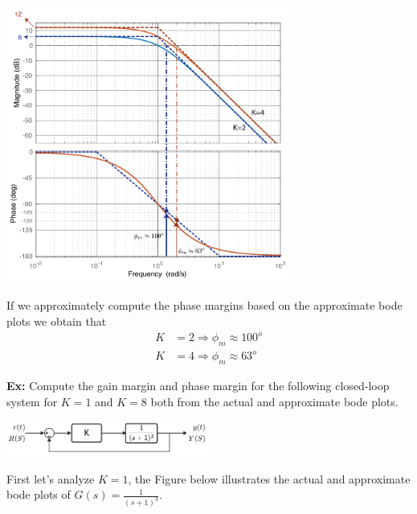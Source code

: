 \documentclass[twoside]{article}
\begin{document}
\begin{center}
\begin{minipage}[h]{\linewidth}
    \begin{center}
      \includegraphics[width=0.7\textwidth]{margin}
    \end{center}
\end{minipage}
\end{center}

If we approximately compute the phase margins based
on the approximate bode plots we obtain that 
%
\begin{align*}
  K &= 2 \Rightarrow \phi_m \approx 100^o 
  \\
  K &= 4 \Rightarrow \phi_m \approx 63^o 
\end{align*}

\newpage

\textbf{Ex:} Compute the gain margin and phase margin 
for the following closed-loop system for $K = 1$ and $K = 8$
both from the actual and approximate bode plots. 

\begin{center}
\begin{minipage}[h]{\linewidth}
    \begin{center}
      \includegraphics[width=0.5\textwidth]{ex3block}
    \end{center}
\end{minipage}
\end{center}

First let's analyze $K = 1$, the Figure below illustrates the
actual and approximate bode plots of $G(s) = \frac{1}{(s+1)^3}$.
\end{document}
